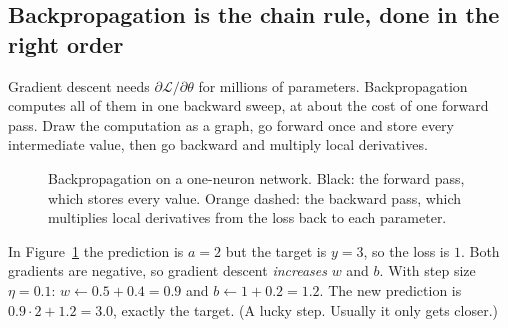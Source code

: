 \subsection{Backpropagation is the chain rule, done in the right order}
Gradient descent needs $\partial\mathcal L/\partial\theta$ for millions of parameters. Backpropagation computes all of them in one backward sweep, at about the cost of one forward pass. Draw the computation as a graph, go forward once and store every intermediate value, then go backward and multiply local derivatives.

\begin{figure}[h]
\centering
{}
\caption{Backpropagation on a one-neuron network. Black: the forward pass, which stores every value. Orange dashed: the backward pass, which multiplies local derivatives from the loss back to each parameter.}
\label{fig:backprop}
\end{figure}

\begin{examplebox}
In Figure~\ref{fig:backprop} the prediction is $a=2$ but the target is $y=3$, so the loss is $1$. Both gradients are negative, so gradient descent \emph{increases} $w$ and $b$. With step size $\eta=0.1$: $w\leftarrow 0.5+0.4=0.9$ and $b\leftarrow 1+0.2=1.2$. The new prediction is $0.9\cdot2+1.2=3.0$, exactly the target. (A lucky step. Usually it only gets closer.)
\end{examplebox}

